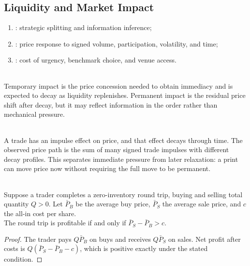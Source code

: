 \subsection{Liquidity and Market Impact}

\begin{taxonomy} 
\begin{enumerate}[label=\roman*.]
\setlength{\itemsep}{0pt}
\item {}: strategic splitting and information inference;
\item {}: price response to signed volume, participation, volatility, and time;
\item {}: cost of urgency, benchmark choice, and venue access.
\end{enumerate}
\end{taxonomy}

\begin{definition} \\
Temporary impact is the price concession needed to obtain immediacy and is expected to decay as liquidity replenishes. Permanent impact is the residual price shift after decay, but it may reflect information in the order rather than mechanical pressure.
\end{definition}

\begin{mechanism} \\
A trade has an impulse effect on price, and that effect decays through time. The observed price path is the sum of many signed trade impulses with different decay profiles. This separates immediate pressure from later relaxation: a print can move price now without requiring the full move to be permanent.
\end{mechanism}

\begin{proposition} \\
Suppose a trader completes a zero-inventory round trip, buying and selling total quantity $Q>0$. Let $\bar{P}_B$ be the average buy price, $\bar{P}_S$ the average sale price, and $c$ the all-in cost per share.\\
The round trip is profitable if and only if $\bar{P}_S-\bar{P}_B>c$.
\begin{proof}
The trader pays $Q\bar{P}_B$ on buys and receives $Q\bar{P}_S$ on sales. Net profit after costs is $Q(\bar{P}_S-\bar{P}_B-c)$, which is positive exactly under the stated condition.
\end{proof}
\end{proposition}

